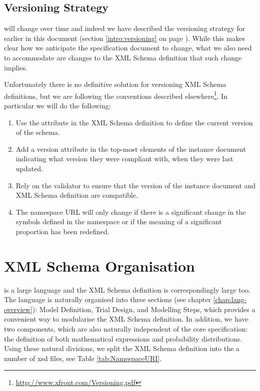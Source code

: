 \subsection{Versioning Strategy}

\pharmml will change over time and indeed we have described the
versioning strategy for \pharmml earlier in this document (section
\ref{intro:versioning} on page \pageref{intro:versioning}). While this
makes clear how we anticipate the specification document to change,
what we also need to accommodate are changes to the XML Schema
definition that such change implies.

Unfortunately there is no definitive solution for versioning XML
Schema definitions, but we are following the conventions described
elsewhere\footnote{\url{http://www.xfront.com/Versioning.pdf}}. In particular we
will do the following:
\begin{enumerate}
\item Use the  attribute in the XML Schema definition to
  define the current version of the schema.
\item Add a version attribute in the top-most elements of the instance
  document indicating what version they were compliant with, when they
  were last updated.
\item Rely on the \pharmml validator to ensure that the version of the
  instance document and XML Schema definition are compatible.
\item The namespace URL will only change if there is a significant
  change in the symbols defined in the namespace or if the meaning of
  a significant proportion has been redefined.
\end{enumerate}

\section{XML Schema Organisation}

\pharmml is a large language and the XML Schema definition is
correspondingly large too. The language is naturally organised into three 
sections (see chapter \ref{chap:lang-overview}): Model Definition, Trial Design, 
and Modelling Steps, which provides a convenient way to modularise
the XML Schema definition. In addition, we have two components, which
are also naturally independent of the core \pharmml specification: the
definition of both mathematical expressions and probability
distributions. Using these natural divisions, we split the \pharmml XML Schema
definition into the a number of xsd files, see Table \ref{tab:NamespaceURI}.

